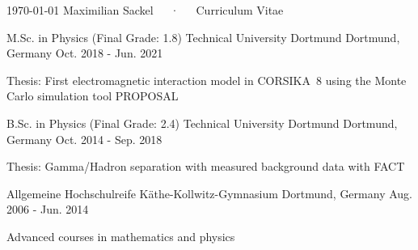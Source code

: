 \documentclass[11pt, a4paper]{Awesome-CV/awesome-cv}
\begin{document}
\makecvheader

\makecvfooter
{\today}
{Maximilian Sackel~~~·~~~Curriculum Vitae}
{\thepage}




\begin{cventries}
    \cventry
    {M.Sc. in Physics \quad (Final Grade: 1.8)} %
    {Technical University Dortmund} %
    {Dortmund, Germany} %
    {Oct. 2018 - Jun. 2021} %
    {
        \begin{cvitems} %
        \item {Thesis: First electromagnetic interaction model in CORSIKA~8 using the Monte Carlo simulation tool PROPOSAL}
        \end{cvitems}
    }%

    \cventry
    {B.Sc. in Physics \quad (Final Grade: 2.4)} %
    {Technical University Dortmund} %
    {Dortmund, Germany} %
    {Oct. 2014 - Sep. 2018} %
    {
        \begin{cvitems} %
        \item {Thesis: Gamma/Hadron separation with measured background data with FACT}
        \end{cvitems}
    }%

    \cventry
    {Allgemeine Hochschulreife} %
    {Käthe-Kollwitz-Gymnasium} %
    {Dortmund, Germany} %
    {Aug. 2006 - Jun. 2014} %
    {
        \begin{cvitems} %
        \item {Advanced courses in mathematics and physics}
        \end{cvitems}
    }%
\end{cventries}
\end{document}
